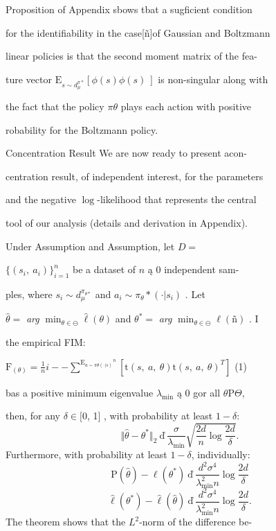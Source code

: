 \documentclass[a4paper,12pt]{article}
\begin{document}
Proposition of Appendix sbows tbat a sugficient condition

for the identifiability in the case[ñ]of Gaussian and Boltzmann

linear policies is that the second moment matrix of the fea-

ture vector $\mathrm{E}_{s\sim d_{\mu}^{\pi*}} [\phi(s)\phi(s)\ ]$ is non-singular along with

the fact that the policy $\pi\theta$ plays each action with positive

robability for the Boltzmann policy.

Concentration Result We are now ready to present acon-

centration result, of independent interest, for the parameters

and the negative $\log$-likelihood that represents the central

tool of our analysis (details and derivation in Appendix).

Under Assumption and Assumption, let $D =$

$\{(s_{i},\ a_{i})\}_{i=1}^{n}$ be a dataset of $n$ ą $0$ independent sam-

ples, where $s_{i} \sim d_{\mu}^{\pi_{\theta*}}$ and $a_{i} \sim \pi_{\theta}*(\cdot|s_{i})$ . Let

$\hat{\theta} =$ {\it arg} $\displaystyle \min_{\theta\in\ominus}\hat{\ell}(\theta)$ and $\theta^{*} =$ {\it arg} $\displaystyle \min_{\theta\in\ominus}\ell(ñ)$ . I

the empirical FIM:
\begin{center}
$\mathrm{F}_{(\theta)} = \displaystyle \frac{1}{n}i--\sum^{\mathrm{E}_{a\sim\pi\theta(\cdot|s)}}^{n}[\mathrm{t}(s,\ a,\ \theta)\mathrm{t}(s,\ a,\ \theta)^{T}]$   (1)
\end{center}
bas a positive minimum eigenvalue $\hat{\lambda}_{\min}$ ą $0$ gor all $\theta \mathrm{P}\Theta,$

then, for any $\delta\in [0$, 1$]$ , with probability at least $ 1-\delta$:
$$
\Vert\hat{\theta}-\theta^{*}\Vert_{2}\ ď\ \frac{\sigma}{\lambda_{\min}}\sqrt{\frac{2d}{n}\log\frac{2d}{\delta}}.
$$
Furthermore, with probability at least $ 1-\delta$, individually:
$$
\mathrm{P}(\hat{\theta})-\ell(\theta^{*})\ ď\ \frac{d^{2}\sigma^{4}}{\lambda_{\min}^{2}n}\log\frac{2d}{\delta}
$$
$$
\hat{\ell}(\theta^{*})-\hat{\ell}(\hat{\theta})\ ď\ \frac{d^{2}\sigma^{4}}{\lambda_{\min}^{2}n}\log\frac{2d}{\delta}.
$$
The theorem shows that the $L^{2}$-norm of the difference be-
\end{document}
